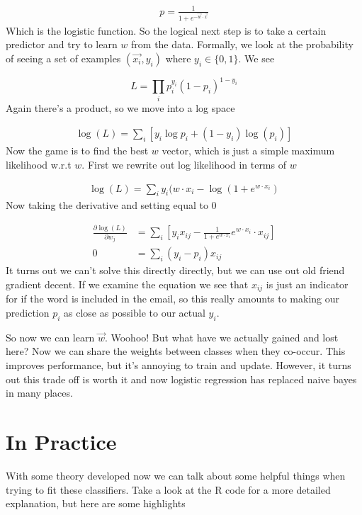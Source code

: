 \begin{align}
p = \frac{1}{1+e^{-\vec{w}\cdot \vec{x}}}
\end{align}
Which is the logistic function. So the logical next step is to take a certain predictor and try to learn $w$ from the data. Formally, we look at the probability of seeing a set of examples $(\vec{x_i}, y_i)$ where $y_i \in \{0, 1\}$. We see

\begin{equation}
    L = \prod_i p_i^{y_i} (1-p_i)^{1-y_i}
\end{equation}
Again there's a product, so we move into a log space

\begin{align}
    \log(L) = \sum_i \left [ y_i \log p_i + (1- y_i) \log(p_i) \right]
\end{align}
Now the game is to find the best $w$ vector, which is just a simple maximum likelihood w.r.t $w$. First we rewrite out log likelihood in terms of $w$

\begin{align}
    \log(L) = \sum_i y_i (w \cdot x_i - \log(1+e^{w \cdot x_i})
\end{align}
Now taking the derivative and setting equal to 0

\begin{align}
\frac{\partial \log(L)}{\partial w_j} &= \sum_i \left[ y_i x_{ij} - \frac{1}{1 + e^{w \cdot x_i}}e^{w\cdot x_i}\cdot x_{ij} \right] \\
0 &= \sum_i (y_i - p_i) x_{ij}
\end{align}
It turns out we can't solve this directly directly, but we can use out old friend gradient decent. If we examine the equation we see that $x_{ij}$ is just an indicator for if the word is included in the email, so this really amounts to making our prediction $p_i$ as close as possible to our actual $y_i$. 

So now we can learn $\vec{w}$. Woohoo! But what have we actually gained and lost here? Now we can share the weights between classes when they co-occur. This improves performance, but it's annoying to train and update. However, it turns out this trade off is worth it and now logistic regression has replaced naive bayes in many places. 

\section{In Practice}
With some theory developed now we can talk about some helpful things when trying to fit these classifiers. Take a look at the R code for a more detailed explanation, but here are some highlights

